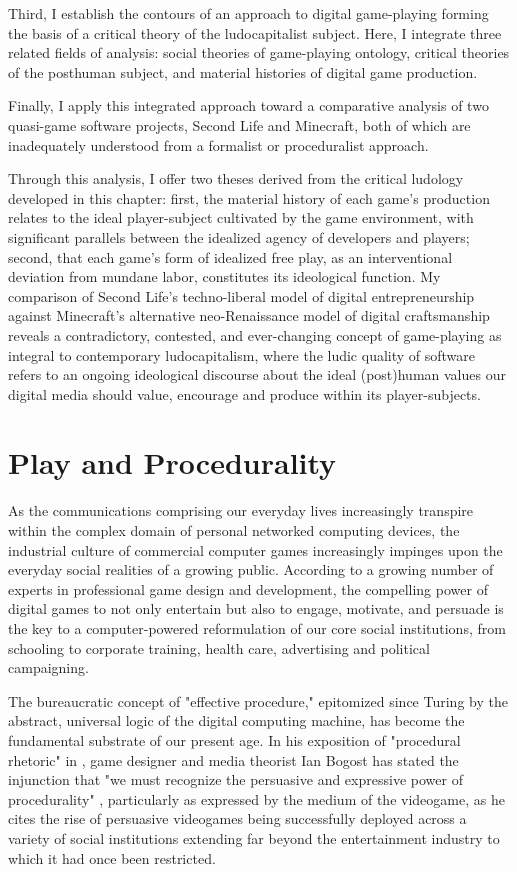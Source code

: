 Third, I establish the contours of an approach to digital game-playing forming the basis of a critical theory of the ludocapitalist subject. Here, I integrate three related fields of analysis: social theories of game-playing ontology, critical theories of the posthuman subject, and material histories of digital game production.

Finally, I apply this integrated approach toward a comparative analysis of two quasi-game software projects, Second Life and Minecraft, both of which are inadequately understood from a formalist or proceduralist approach.

Through this analysis, I offer two theses derived from the critical ludology developed in this chapter: first, the material history of each game's production relates to the ideal player-subject cultivated by the game environment, with significant parallels between the idealized agency of developers and players; second, that each game's form of idealized free play, as an interventional deviation from mundane labor, constitutes its ideological function. My comparison of Second Life's techno-liberal model of digital entrepreneurship against Minecraft's alternative neo-Renaissance model of digital craftsmanship reveals a contradictory, contested, and ever-changing concept of game-playing as integral to contemporary ludocapitalism, where the ludic quality of software refers to an ongoing ideological discourse about the ideal (post)human values our digital media should value, encourage and produce within its player-subjects.

\section{Play and Procedurality}
As the communications comprising our everyday lives increasingly transpire within the complex domain of personal networked computing devices, the industrial culture of commercial computer games increasingly impinges upon the everyday social realities of a growing public. According to a growing number of experts in professional game design and development, the compelling power of digital games to not only entertain but also to engage, motivate, and persuade is the key to a computer-powered reformulation of our core social institutions, from schooling to corporate training, health care, advertising and political campaigning.

The bureaucratic concept of "effective procedure," epitomized since Turing by the abstract, universal logic of the digital computing machine, has become the fundamental substrate of our present age. In his exposition of "procedural rhetoric" in , game designer and media theorist Ian Bogost has stated the injunction that "we must recognize the persuasive and expressive power of procedurality" \autocite*[340]{Bogost2007-ow}, particularly as expressed by the medium of the videogame, as he cites the rise of persuasive videogames being successfully deployed across a variety of social institutions extending far beyond the entertainment industry to which it had once been restricted.

